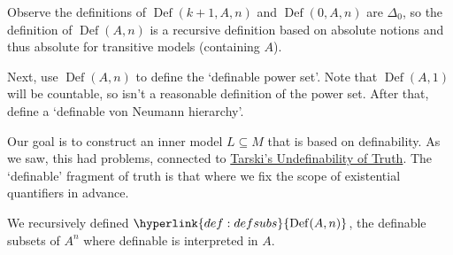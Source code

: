 \documentclass{article}
\newcommand{\named}[1]{\textbf{#1}\index{#1}}
\newcommand{\1}{\mathbbm{1}}
\DeclareMathOperator{\Diag}{Diag}
\DeclareMathOperator{\Proj}{Proj}
\DeclareMathOperator{\Def}{Def}
\begin{document}

Observe the definitions of $\Def(k+1,A,n)$ and $\Def(0,A,n)$ are $\Delta_0$, so the definition of $\Def(A,n)$ is a recursive definition based on absolute notions and thus absolute for transitive models (containing $A$).

Next, use $\Def(A,n)$ to define the `definable power set'.
Note that $\Def(A,1)$ will be countable, so isn't a reasonable definition of the power set.
After that, define a `definable von Neumann hierarchy'.

\newlec
Our goal is to construct an inner model $L \subseteq M$ that is based on definability.
As we saw, this had problems, connected to \hyperlink{thm:tarski}{Tarski's Undefinability of Truth}.
The `definable' fragment of truth is that where we fix the scope of existential quantifiers in advance.

We recursively defined $\hyperlink{def:defsubs}{\Def(A,n)}$, the definable subsets of $A^n$ where definable is interpreted in $A$.
\end{document}
